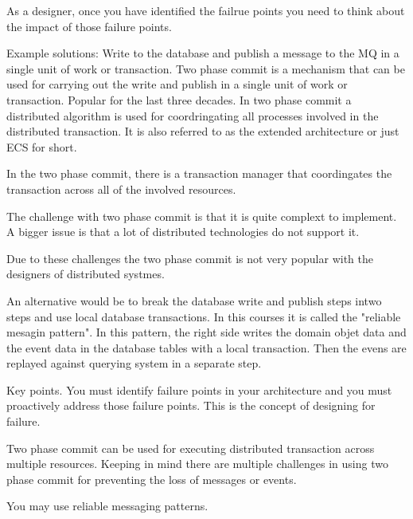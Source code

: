 As a designer, once you have identified the failrue points you need to think about the impact of those failure points.

Example solutions:
Write to the database and publish a message to the MQ in a single unit of work or transaction.
Two phase commit is a mechanism that can be used for carrying out the write and publish in a single unit of work or transaction.
Popular for the last three decades.
In two phase commit a distributed algorithm is used for coordringating all processes involved in the distributed transaction.
It is also referred to as the extended architecture or just ECS for short.

In the two phase commit, there is a transaction manager that coordingates the transaction across all of the involved resources.

The challenge with two phase commit is that it is quite complext to implement.
A bigger issue is that a lot of distributed technologies do not support it.

Due to these challenges the two phase commit is not very popular with the designers of distributed systmes.


An alternative would be to break the database write and publish steps intwo steps and use local database transactions.
In this courses it is called the "reliable mesagin pattern". In this pattern, the right side writes the domain objet data and the event data in the database tables with a local transaction.
Then the evens are replayed against querying system in a separate step.

Key points.
You must identify failure points in your architecture and you must proactively address those failure points.
This is the concept of designing for failure.

Two phase commit can be used for executing distributed transaction across multiple resources.
Keeping in mind there are multiple challenges in using two phase commit for preventing the loss of messages or events.

You may use reliable messaging patterns.

